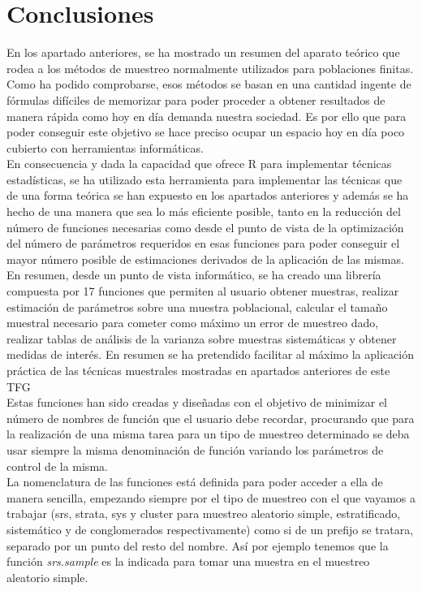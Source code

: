 \section{Conclusiones}
En los apartado anteriores, se ha mostrado un resumen del aparato teórico que rodea a los métodos de muestreo normalmente utilizados para poblaciones finitas.\\

Como ha podido comprobarse, esos métodos se basan en una cantidad ingente de fórmulas difíciles de memorizar para poder proceder a obtener resultados de manera rápida como hoy en día demanda nuestra sociedad. Es por ello que para poder conseguir este objetivo se hace preciso ocupar un espacio hoy en día poco cubierto con herramientas informáticas. \\

En consecuencia y dada la capacidad que ofrece R para implementar técnicas estadísticas, se ha utilizado esta herramienta para implementar las técnicas que de una forma teórica se han expuesto en los apartados anteriores y además se ha hecho de una manera que sea lo más eficiente posible, tanto en la reducción del número de funciones necesarias como desde el punto de vista de la optimización del número de parámetros requeridos en esas funciones para poder conseguir el mayor número posible de estimaciones derivados de la aplicación de las mismas.\\

En resumen, desde un punto de vista informático, se ha creado una librería compuesta por 17 funciones que permiten al usuario obtener muestras, realizar estimación de parámetros sobre una muestra poblacional, calcular el tamaño muestral necesario para cometer como máximo un error de muestreo dado, realizar tablas de análisis de la varianza sobre muestras sistemáticas y obtener medidas de interés. En resumen se ha pretendido facilitar al máximo la aplicación práctica de las técnicas muestrales mostradas en apartados anteriores de este TFG\\

Estas funciones han sido creadas y diseñadas con el objetivo de minimizar el número de nombres de función que el usuario debe recordar, procurando que para la realización de una misma tarea para un tipo de muestreo determinado se deba usar siempre la misma denominación de función variando los parámetros de control de la misma.\\

La nomenclatura de las funciones está definida para poder acceder a ella de manera sencilla, empezando siempre por el tipo de muestreo con el que vayamos a trabajar (srs, strata, sys y cluster para muestreo aleatorio  simple, estratificado, sistemático y de conglomerados respectivamente) como si de un prefijo se tratara, separado por un punto del resto del nombre. Así por ejemplo tenemos que la función \textit{srs.sample} es la indicada para tomar una muestra en el muestreo aleatorio simple.\\

